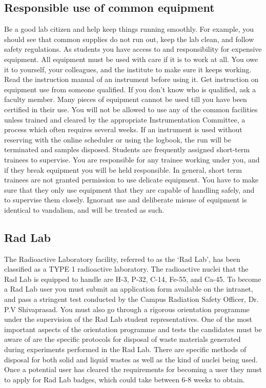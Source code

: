 \documentclass[a4paper]{extarticle}
\begin{document}
\subsection{Responsible use of common equipment}
Be a good lab citizen and help keep things
running smoothly. For example, you should see that common supplies do not run out, keep
the lab clean, and follow safety regulations. As students you have access to and
responsibility for expensive equipment. All equipment must be used with care if it is to work
at all. You owe it to yourself, your colleagues, and the institute to make sure it keeps
working. Read the instruction manual of an instrument before using it. Get instruction on
equipment use from someone qualified. If you don't know who is qualified, ask a faculty
member. Many pieces of equipment cannot be used till you have been certified in their use.
You will not be allowed to use any of the common facilities unless trained and cleared by
the appropriate Instrumentation Committee, a process which often requires several weeks. If
an instrument is used without reserving with the online scheduler or using the logbook, the
run will be terminated and samples disposed. Students are frequently assigned short-term
trainees to supervise. You are responsible for any trainee working under you, and if they
break equipment you will be held responsible. In general, short term trainees are not granted
permission to use delicate equipment. You have to make sure that they only use equipment
that they are capable of handling safely, and to supervise them closely. Ignorant use and
deliberate misuse of equipment is identical to vandalism, and will be treated as such.

\subsection{Rad Lab}
The Radioactive Laboratory facility, referred to as the ‘Rad Lab’, has been
classified as a TYPE 1 radioactive laboratory. The radioactive nuclei that the Rad Lab is
equipped to handle are H-3, P-32, C-14, Fe-55, and Ca-45. To become a Rad Lab user you
must submit an application form available on the intranet, and pass a stringent test
conducted by the Campus Radiation Safety Officer, Dr. P.V Shivaprasad. You must also go
through a rigorous orientation programme under the supervision of the Rad Lab student
representatives. One of the most important aspects of the orientation programme and tests
the candidates must be aware of are the specific protocols for disposal of waste materials
generated during experiments performed in the Rad Lab. There are specific methods of
disposal for both solid and liquid wastes as well as the kind of nuclei being used. Once a
potential user has cleared the requirements for becoming a user they must to apply for Rad
Lab badges, which could take between 6-8 weeks to obtain.
\end{document}
